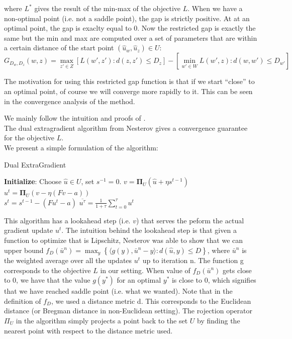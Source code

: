 where ${L}^*$ gives the result of the min-max of the objective
${L}$. When we have a non-optimal point (i.e. not a saddle point), the
gap is strictly positive. At at an optimal point, the gap is exaclty equal to 0.
Now the restricted gap is exactly the same but the min and max are computed over
a set of parameters that are within a certain distance of the start point
$(\hat{ u}_{ w},\hat{ u}_{ z}) \in {U}$:
\begin{equation}
  {G}_{D_{ w}, D_{ z}}( w,  z) = \max_{ z' \in
{Z}} \left[ {L}( w',  z') : d( z,  z') \leq
D_{ z} \right] - \left [ \min_{ w' \in {W}} {L}( w',
 z) : d( w,  w') \leq D_{ w'} \right ]
\end{equation}

The motivation for using this restricted gap function is that if we start
``close'' to an optimal point, of course we will converge more rapidly to it.
This can be seen in the convergence analysis of the method.

We mainly follow the intuition and proofs of
\cite{taskarStructuredPredictionDual2006}.\\
The dual extragradient algorithm from Nesterov gives a convergence guarantee for
the objective ${L}$.\\
We present a simple formulation of the algorithm:
\begin{algorithm}
  \caption{Dual ExtraGradient}
  \label{alg:extra}
\begin{algorithmic}
  \STATE \textbf{Initialize}: Choose $\hat{ u} \in {U}$, set $ s^{-1} = 0$.
  \STATE $ v = \mathbf{\Pi}_{{U}}(\hat{ u} + \eta  s^{t-1})$\\
  \STATE $ u^t = \mathbf{\Pi}_{{U}}( v - \eta ( F  v -  a))$\\
  \STATE $ s^t =   s^{t-1} - ( F  u^t -  a)$
  \ENDFOR
  \RETURN $\overline{ u^{\tau}} = \frac{1}{1 + \tau} \sum_{t=0}^{\tau}  u^t$
\end{algorithmic}
\end{algorithm}

This algorithm has a lookahead step (i.e. $v$) that serves the peform the actual
gradient update $u^t$. The intuition behind the lookahead step is that given a
function to optimize that is Lipschitz, Nesterov was able to show that we can
upper bound $f_{D}(\bar{u}^n) = \max_y \left \{ \langle g(y),\bar{u}^n - y
\rangle : d(\hat{u},y) \leq D \right \}$, where $\bar{u}^n$ is the weighted
average over all the updates $u^t$ up to iteration n. The function g corresponds
to the objective ${L}$ in our setting. When value of $f_D(\bar{u}^n)$ gets close
to 0, we have that the value $g(y^*)$ for an optimal $y^*$ is close to 0, which
signifies that we have reached saddle point (i.e. what we wanted). Note that in
the definition of $f_D$, we used a
distance metric d. This corresponds to the Euclidean distance (or Bregman
distance in non-Euclidean setting). The rojection operator $\Pi_{{U}}$ in the
algorithm simply projects a point back to the set ${U}$ by finding the nearest
point with respect to the distance metric used.

